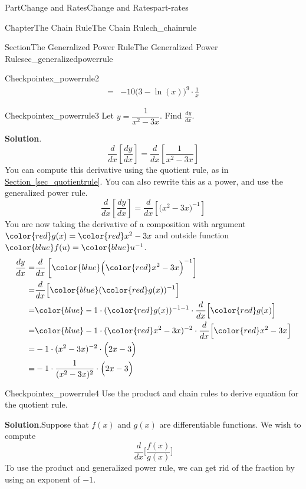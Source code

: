 \documentclass{tufte-book}
\newcommand{\blocktitlefont}{\relax}
\newcommand{\xreffont}{\relax}
\numberwithin{equation}{chapter}
\newcommand{\red}[1]{   {\color{red}   #1}   }
\newcommand{\blue}[1]{  {\color{blue}  #1}  }
\newcommand{\ddx}[1]{ \dfrac{d}{dx} \Big[ #1 \Big]  }
\newcommand{\ddxfrac}[1]{ \dfrac{d}{dx} \left[ #1 \right]  }
\newcommand{\amp}{&}
\begin{document}
\begin{partptx}{Part}{Change and Rates}{}{Change and Rates}{}{}{part-rates}
\begin{chapterptx}{Chapter}{The Chain Rule}{}{The Chain Rule}{}{}{ch_chainrule}
\begin{sectionptx}{Section}{The Generalized Power Rule}{}{The Generalized Power Rule}{}{}{sec_generalizedpowerrule}
\begin{inlineexercise}{Checkpoint}{}{ex_powerrule2}
\begin{align*}
= \amp -10 \Big(3-\ln(x)\Big)^9\cdot \frac{1}{x}
\end{align*}
%
\end{inlineexercise}%
\begin{inlineexercise}{Checkpoint}{}{ex_powerrule3}%
Let \(y = \dfrac{1}{x^2-3x}\).  Find \(\frac{dy}{dx}\).%
\par\smallskip%
\noindent\textbf{\blocktitlefont Solution}.\hypertarget{ex_powerrule3-2}{}\quad{}%
\begin{equation*}
\ddxfrac{\frac{dy}{dx}} = \ddxfrac{  \dfrac{1}{x^2-3x} }
\end{equation*}
You can compute this derivative using the quotient rule, as in \hyperref[sec_quotientrule]{Section~{\xreffont\ref{sec_quotientrule}}}. You can also rewrite this as a power, and use the generalized power rule.%
\begin{equation*}
\ddxfrac{\frac{dy}{dx}} = \ddxfrac{  \Big(x^2-3x\Big)^{-1} }
\end{equation*}
You are now taking the derivative of a composition with argument \(\red{g(x)} = \red{x^2-3x}\) and outside function \(\blue{f(u)} = \blue{u^{-1}} \).%
\begin{align*}
\frac{dy}{dx} = \amp \ddxfrac{ \blue{ \Big(\red{x^2-3x}\Big)^{-1} } } \\
= \amp \ddx{\blue{ ( \red{g(x)} )^{-1} } } \\
= \amp \blue{ -1\cdot ( \red{g(x)} )^{-1-1} }\cdot \ddx{ \red{g(x)} }\\
= \amp \blue{ -1\cdot ( \red{x^2-3x} )^{-2} }\cdot \ddx{ \red{x^2-3x} }\\
= \amp  -1\cdot ( x^2-3x )^{-2} \cdot \Big(2x-3\Big) \\
= \amp  -1\cdot \dfrac{1}{( x^2-3x )^{2}} \cdot \Big(2x-3\Big) 
\end{align*}
%
\end{inlineexercise}%
\begin{inlineexercise}{Checkpoint}{}{ex_powerrule4}%
Use the product and chain rules to derive equation for the quotient rule.%
\par\smallskip%
\noindent\textbf{\blocktitlefont Solution}.\hypertarget{ex_powerrule4-2}{}\quad{}Suppose that  \(f(x)\) and \(g(x)\) are differentiable functions.  We wish to compute%
\begin{equation*}
\ddx{ \dfrac{f(x)}{g(x)} } 
\end{equation*}
To use the product and generalized power rule, we can get rid of the fraction by using an exponent of \(-1\).%
\begin{equation*}

\end{equation*}
\end{inlineexercise}
\end{sectionptx}
\end{chapterptx}
\end{partptx}
\end{document}
